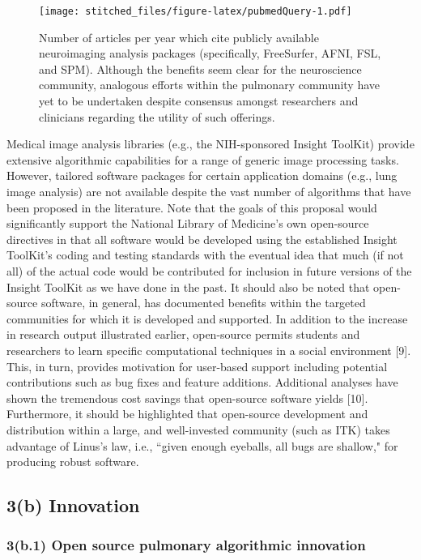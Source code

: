\documentclass[11pt,]{article}
\begin{document}
\begin{figure}[htbp]
\centering
\texttt{[image: stitched\_files/figure-latex/pubmedQuery-1.pdf]}
\caption{Number of articles per year which cite publicly available
neuroimaging analysis packages (specifically, FreeSurfer, AFNI, FSL, and
SPM). Although the benefits seem clear for the neuroscience community,
analogous efforts within the pulmonary community have yet to be
undertaken despite consensus amongst researchers and clinicians
regarding the utility of such offerings.}
\end{figure}

Medical image analysis libraries (e.g., the NIH-sponsored Insight
ToolKit) provide extensive algorithmic capabilities for a range of
generic image processing tasks. However, tailored software packages for
certain application domains (e.g., lung image analysis) are not
available despite the vast number of algorithms that have been proposed
in the literature. Note that the goals of this proposal would
significantly support the National Library of Medicine's own open-source
directives in that all software would be developed using the established
Insight ToolKit's coding and testing standards with the eventual idea
that much (if not all) of the actual code would be contributed for
inclusion in future versions of the Insight ToolKit as we have done in
the past. It should also be noted that open-source software, in general,
has documented benefits within the targeted communities for which it is
developed and supported. In addition to the increase in research output
illustrated earlier, open-source permits students and researchers to
learn specific computational techniques in a social environment {[}9{]}.
This, in turn, provides motivation for user-based support including
potential contributions such as bug fixes and feature additions.
Additional analyses have shown the tremendous cost savings that
open-source software yields {[}10{]}. Furthermore, it should be
highlighted that open-source development and distribution within a
large, and well-invested community (such as ITK) takes advantage of
Linus's law, i.e., ``given enough eyeballs, all bugs are shallow," for
producing robust software.

\subsection{\textbf{3(b) Innovation}}\label{b-innovation}

\subsubsection{3(b.1) Open source pulmonary algorithmic
innovation}\label{b.1-open-source-pulmonary-algorithmic-innovation}
\end{document}
